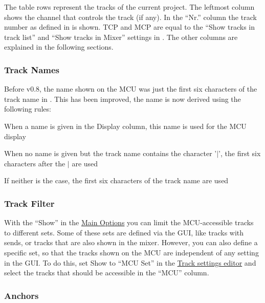
The table rows represent the tracks of the current project. The
leftmost column shows the channel that controls the track (if any). In the
``Nr.'' column the track number as defined in \reaper is shown. TCP and MCP
are equal to the ``Show tracks in track list'' and ``Show tracks in
Mixer'' settings in \reaper. The other columns are explained in the
following sections.

\subsubsection{Track Names}\label{tracknames} 
Before v0.8, the name shown on the MCU was just the first six characters of the
track name in \reaper. This has been  improved, the name is now derived using the
following rules:

\begin{compactitem}
\item When a name is given in the Display column, this name is used
  for the MCU display
\item When no name is given but the track name contains the character
  '$\mid$', the first six characters after the $\mid$ are used
\item If neither is the case, the first six characters of the track
  name are used
\end{compactitem}


\subsubsection{Track Filter}\label{trackfilter}
With the ``Show'' \attribute in the
\hyperref[T:multitrack_options1]{Main Options} you can limit the
MCU-accessible tracks to different sets. Some of these
sets are defined via the \reaper GUI, like tracks
with sends, or tracks that are also shown in the \reaper mixer. However,
you can also define a \mcu specific set, so that the tracks 
shown on the MCU are independent of any setting in the \reaper
GUI. To do this, set  Show \attribute to ``MCU Set'' in the
\hyperref[F:Screenshot_Track_Mode]{Track settings editor} and select
the tracks that should be accessible in the ``MCU'' column.

\subsubsection{Anchors}\label{anchor}


